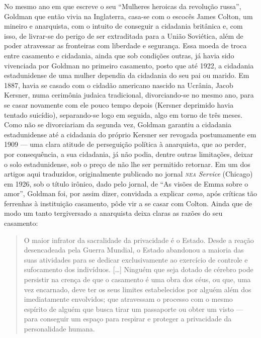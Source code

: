 No mesmo ano em que escreve o seu ``Mulheres heroicas da revolução
russa'', Goldman que então vivia na Inglaterra, casa-se com o escocês
James Colton, um mineiro e anarquista, com o intuito de conseguir a
cidadania britânica e, com isso, de livrar-se do perigo de ser
extraditada para a União Soviética, além de poder atravessar as
fronteiras com liberdade e segurança. Essa moeda de troca entre
casamento e cidadania, ainda que sob condições outras, já havia sido
vivenciada por Goldman no primeiro casamento, posto que até 1922, a
cidadania estadunidense de uma mulher dependia da cidadania do seu pai
ou marido. Em 1887, havia se casado com o cidadão americano nascido na
Ucrânia, Jacob Kersner, numa cerimônia judaica tradicional,
divorciando-se no mesmo ano, para se casar novamente com ele pouco tempo
depois (Kersner deprimido havia tentado suicídio), separando-se logo em
seguida, algo em torno de três meses. Como não se divorciariam da
segunda vez, Goldman garantiu a cidadania estadunidense até a cidadania
do próprio Kersner ser revogada postumamente em 1909 --- uma clara
atitude de perseguição política à anarquista, que ao perder, por
consequência, a sua cidadania, já não podia, dentre outras limitações,
deixar o solo estadunidense, sob o preço de não lhe ser permitido
retornar. Em um dos artigos aqui traduzidos, originalmente publicado no
jornal \emph{\textsc{nea} Service} (Chicago) em 1926, sob o título irônico, dado
pelo jornal, de ``As visões de Emma sobre o amor'', Goldman foi, por
assim dizer, convidada a explicar \emph{como}, após críticas tão
ferrenhas à instituição casamento, pôde vir a se casar com Colton. Ainda
que de modo um tanto tergiversado a anarquista deixa claras as razões do
seu casamento:

\begin{quote}
O maior infrator da sacralidade da privacidade é o Estado. Desde a
reação desencadeada pela Guerra Mundial, o Estado abandonou a maioria
das suas atividades para se dedicar exclusivamente ao exercício de
controle e sufocamento dos indivíduos. {[}\ldots{]} Ninguém que seja dotado
de cérebro pode persistir na crença de que o casamento é uma obra dos
céus, ou que, uma vez encarnado, deve ter os seus limites estabelecidos
por alguém além dos imediatamente envolvidos; que atravessam o processo
com o mesmo espírito de alguém que busca tirar um passaporte ou obter um
visto --- para conseguir um espaço para respirar e proteger a privacidade
da personalidade humana.
\end{quote}

